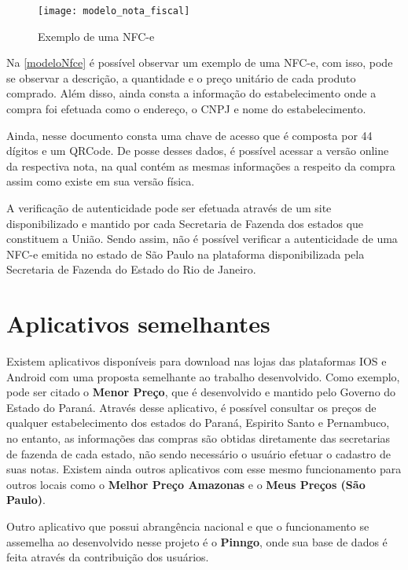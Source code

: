 \begin{figure}[h]
    \centering
    \texttt{[image: modelo\_nota\_fiscal]}
    \caption{Exemplo de uma NFC-e}
    \label{modeloNfce}
\end{figure}

Na \autoref{modeloNfce} é possível observar um exemplo de uma NFC-e, com isso, pode se observar a descrição, a quantidade e o preço unitário de cada produto comprado. Além disso, ainda consta a informação do estabelecimento onde a compra foi efetuada como o endereço, o CNPJ e nome do estabelecimento.

Ainda, nesse documento consta uma chave de acesso que é composta por 44 dígitos e um QRCode. De posse desses dados, é possível acessar a versão online da respectiva nota, na qual contém as mesmas informações a respeito da compra assim como existe em sua versão física.


A verificação de autenticidade pode ser efetuada através de um site disponibilizado e mantido por cada Secretaria de Fazenda dos estados que constituem a União. Sendo assim, não é possível verificar a autenticidade de uma NFC-e emitida no estado de São Paulo na plataforma disponibilizada pela Secretaria de Fazenda do Estado do Rio de Janeiro.

\section{Aplicativos semelhantes}

Existem aplicativos disponíveis para download nas lojas das plataformas IOS e Android com uma proposta semelhante ao trabalho desenvolvido. Como exemplo, pode ser citado o \textbf{Menor Preço}\cite{menorPrecoApp}, que é desenvolvido e mantido pelo Governo do Estado do Paraná. Através desse aplicativo, é possível consultar os preços de qualquer estabelecimento dos estados do Paraná, Espirito Santo e Pernambuco, no entanto, as informações das compras são obtidas diretamente das secretarias de fazenda de cada estado, não sendo necessário o usuário efetuar o cadastro de suas notas. Existem ainda outros aplicativos com esse mesmo funcionamento para outros locais como o \textbf{Melhor Preço Amazonas}\cite{melhorPrecoAmazonasApp} e o \textbf{Meus Preços (São Paulo)}\cite{meusPrecosApp}.

Outro aplicativo que possui abrangência nacional e que o funcionamento se assemelha ao desenvolvido nesse projeto é o \textbf{Pinngo}\cite{pinngoApp}, onde sua base de dados é feita através da contribuição dos usuários.